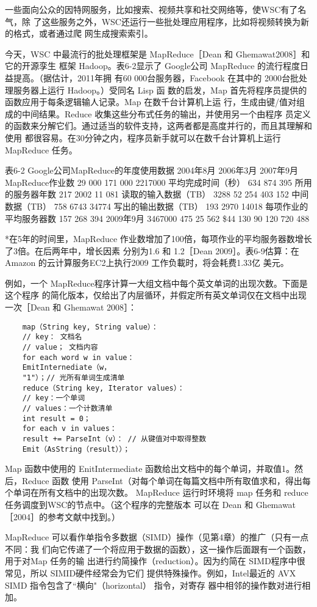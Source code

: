 一些面向公众的因特网服务，比如搜索、视频共享和社交网络等，使WSC有了名气，除
了这些服务之外，WSC还运行一些批处理应用程序，比如将视频转换为新的格式，或者通过爬
网生成搜索索引。

今天，WSC 中最流行的批处理框架是 MapReduce［Dean 和 Ghemawat2008］和它的开源孪生
框架 Hadoop。表6-2显示了 Google公司 MapReduce 的流行程度日益提高。（据估计，2011年拥
有60 000台服务器，Facebook 在其中的 2000台批处理服务器上运行 Hadoop。）受同名 Lisp 函
数的启发，Map 首先将程序员提供的函数应用于每条逻辑输人记录。Map 在数千台计算机上运
行，生成由键/值对组成的中间结果。Reduce 收集这些分布式任务的输出，并使用另一个由程序
员定义的函数来分解它们。通过适当的软件支持，这两者都是高度并行的，而且其理解和使用
都很容易。在30分钟之内，程序员新手就可以在数千台计算机上运行 MapReduce 任务。

表6-2 Google公司MapReduce的年度使用数据
2004年8月
2006年3月
2007年9月
MapReduce作业数
29 000
171 000
2217000
平均完成时间（秒）
634
874
395
所用的服务器年数
217
2002
11 081
读取的输入数据（TB）
3288
52 254
403 152
中间数据（TB）
758
6743
34774
写出的输出数据（TB）
193
2970
14018
每项作业的平均服务器数
157
268
394
2009年9月
3467000
475
25 562
\$44 130
90 120
$7 $20
488

*在5年的时间里，MapReduce 作业数增加了100倍，每项作业的平均服务器数增长了3倍。在后两年中，增长因素
分别为1.6 和 1.2［Dean 2009］。表6-9估算：在 Amazon 的云计算服务EC2上执行2009 工作负載时，将会耗费1.33亿
美元。

例如，一个 MapReduce程序计算一大组文档中每个英文单词的出现次数。下面是这个程序
的简化版本，仅给出了内层循环，并假定所有英文单词仅在文档中出现一次［Dean 和 Ghemawat
2008］：

\begin{verbatim}
    map（String key, String value）：
    // key： 文档名
    // value； 文档内容
    for each word w in value：
    EmitInternediate（w，
    "1"）；// 光所有单词生成清单
    reduce（String key, Iterator values）：
    // key：一个单词
    // values：一个计数清单
    int result = 0；
    for each v in values：
    result += ParseInt（v）： // 从键值对中取得整数
    Emit（AsString（result））；
\end{verbatim}
Map 函数中使用的 EnitIntermediate 函数给出文档中的每个单词，并取值1。然后，Reduce 函数
使用 ParseInt（对每个单词在每篇文档中所有取值求和，得出每个单词在所有文档中的出现次数。
MapReduce 运行时环境将 map 任务和 reduce任务调度到WSC的节点中。（这个程序的完整版本
可以在 Dean 和 Ghemawat［2004］的参考文献中找到。）

MapReduce 可以看作单指令多数据（SIMD）操作（见第4章）的推广（只有一点不同：我
们向它传递了一个将应用于数据的函数），这一操作后面跟有一个函数，用于对Map 任务的输
出进行约简操作（reduction）。因为约简在 SIMD程序中很常见，所以 SIMID硬件经常会为它们
提供特殊操作。例如，Intel最近的 AVX SIMD 指令包含了“横向"（horizontal） 指令，对寄存
器中相邻的操作数对进行相加。

